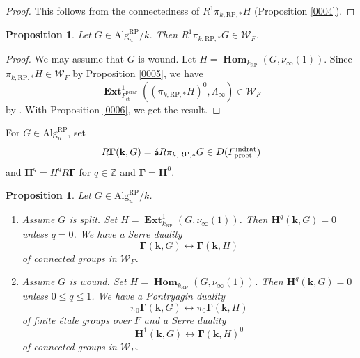 \documentclass{amsart}
\newtheorem{Prop}[Thm]{Proposition}
\theoremstyle{remark}
\numberwithin{equation}{section}
\newcommand{\Z}{\mathbb{Z}}
\newcommand{\et}{\mathrm{et}}
\newcommand{\rat}{\mathrm{rat}}
\newcommand{\ind}{\mathrm{ind}}
\newcommand{\pro}{\mathrm{pro}}
\newcommand{\perar}{\mathrm{perar}}
\newcommand{\Alg}{\mathrm{Alg}}
\newcommand{\alg}[1]{\mathbf{#1}}
\newcommand{\algebrize}{\Acute{\mathsf{a}}}
\newcommand{\RP}{\mathrm{RP}}
\DeclareMathOperator{\sheafhom}{\alg{Hom}}
\DeclareMathOperator{\sheafext}{\alg{Ext}}
\begin{document}
\begin{proof}
	This follows from the connectedness of $R^{1} \pi_{k, \RP, \ast} H$
	(Proposition \ref{0004}).
\end{proof}

\begin{Prop} \label{0009}
	Let $G \in \Alg^{\RP}_{u} / k$.
	Then $R^{1} \pi_{k, \RP, \ast} G \in \mathcal{W}_{F}$.
\end{Prop}

\begin{proof}
	We may assume that $G$ is wound.
	Let $H = \sheafhom_{k_{\RP}}(G, \nu_{\infty}(1))$.
	Since $\pi_{k, \RP, \ast} H \in \mathcal{W}_{F}$ by
	Proposition \ref{0005},
	we have
		\[
				\sheafext_{F^{\perar}_{\et}}^{1}(
					(\pi_{k, \RP, \ast} H)^{0},
					\Lambda_{\infty}
				)
			\in
				\mathcal{W}_{F}
		\]
	by \cite[Proposition 3.1.7 (2)]{Suz24}.
	With Proposition \ref{0006}, we get the result.
\end{proof}

For $G \in \Alg_{u}^{\RP}$, set
	\[
			R \alg{\Gamma}(\alg{k}, G)
		=
			\algebrize
			R \pi_{k, \RP, \ast} G
		\in
			D(F^{\ind\rat}_{\pro\et})
	\]
and $\alg{H}^{q} = H^{q} R \alg{\Gamma}$ for $q \in \Z$
and $\alg{\Gamma} = \alg{H}^{0}$.

\begin{Prop}
	Let $G \in \Alg^{\RP}_{u} / k$.
	\begin{enumerate}
		\item
			Assume $G$ is split.
			Set $H = \sheafext^{1}_{k_{\RP}}(G, \nu_{\infty}(1))$.
			Then $\alg{H}^{q}(\alg{k}, G) = 0$ unless $q = 0$.
			We have a Serre duality
				\[
						\alg{\Gamma}(\alg{k}, G)
					\leftrightarrow
						\alg{\Gamma}(\alg{k}, H)
				\]
			of connected groups in $\mathcal{W}_{F}$.
		\item
			Assume $G$ is wound.
			Set $H = \sheafhom_{k_{\RP}}(G, \nu_{\infty}(1))$.
			Then $\alg{H}^{q}(\alg{k}, G) = 0$ unless $0 \le q \le 1$.
			We have a Pontryagin duality
				\begin{equation} \label{0097}
						\pi_{0}
						\alg{\Gamma}(\alg{k}, G)
					\leftrightarrow
						\pi_{0}
						\alg{\Gamma}(\alg{k}, H)
				\end{equation}
			of finite \'etale groups over $F$ and a Serre duality
				\begin{equation} \label{0098}
						\alg{H}^{1}(\alg{k}, G)
					\leftrightarrow
						\alg{\Gamma}(\alg{k}, H)^{0}
				\end{equation}
			of connected groups in $\mathcal{W}_{F}$.
	\end{enumerate}
\end{Prop}
\end{document}
